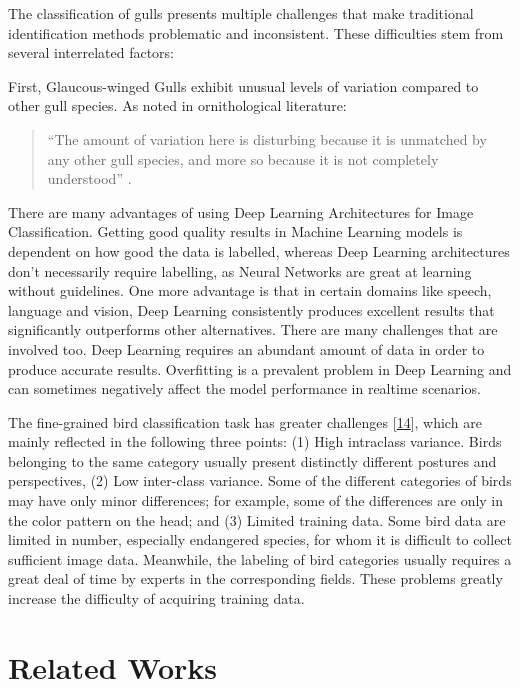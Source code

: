 The classification of gulls presents multiple challenges that make traditional identification methods problematic and inconsistent. These difficulties stem from several interrelated factors:

First, Glaucous-winged Gulls exhibit unusual levels of variation compared to other gull species. As noted in ornithological literature:

\begin{quote}
    ``The amount of variation here is disturbing because it is unmatched by any other gull species, and more so because it is not completely understood'' \citep{adriaens2022gulls}.
\end{quote}


There are many advantages of using Deep Learning
Architectures for Image Classification. Getting good quality
results in Machine Learning models is dependent on how good
the data is labelled, whereas Deep Learning architectures don’t
necessarily require labelling, as Neural Networks are great at
learning without guidelines. One more advantage is that in
certain domains like speech, language and vision, Deep
Learning consistently produces excellent results that
significantly outperforms other alternatives. There are many
challenges that are involved too. Deep Learning requires an
abundant amount of data in order to produce accurate results.
Overfitting is a prevalent problem in Deep Learning and can
sometimes negatively affect the model performance in realtime scenarios.





The fine-grained bird classification task has greater challenges [\href{https://www.mdpi.com/2076-2615/13/2/264#B14-animals-13-00264}{14}], which are mainly reflected in the following three points: (1) High intraclass variance. Birds belonging to the same category usually present distinctly different postures and perspectives, (2) Low inter-class variance. Some of the different categories of birds may have only minor differences; for example, some of the differences are only in the color pattern on the head; and (3) Limited training data. Some bird data are limited in number, especially endangered species, for whom it is difficult to collect sufficient image data. Meanwhile, the labeling of bird categories usually requires a great deal of time by experts in the corresponding fields. These problems greatly increase the difficulty of acquiring training data.




\section*{Related Works}
